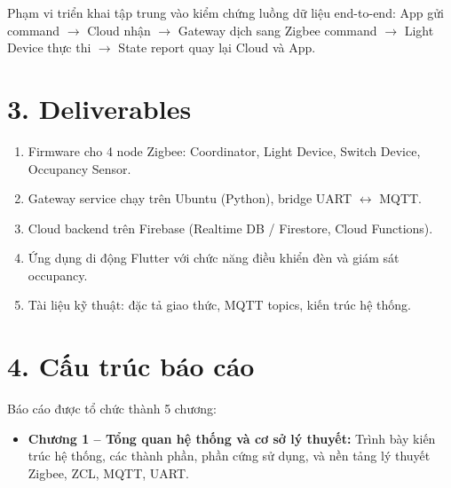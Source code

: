 Phạm vi triển khai tập trung vào kiểm chứng luồng dữ liệu end-to-end: App gửi command $\rightarrow$ Cloud nhận $\rightarrow$ Gateway dịch sang Zigbee command $\rightarrow$ Light Device thực thi $\rightarrow$ State report quay lại Cloud và App.

\section*{3. Deliverables}
\label{sec:modau-deliverables}

\begin{enumerate}
    \item Firmware cho 4 node Zigbee: Coordinator, Light Device, Switch Device, Occupancy Sensor.
    \item Gateway service chạy trên Ubuntu (Python), bridge UART $\leftrightarrow$ MQTT.
    \item Cloud backend trên Firebase (Realtime DB / Firestore, Cloud Functions).
    \item Ứng dụng di động Flutter với chức năng điều khiển đèn và giám sát occupancy.
    \item Tài liệu kỹ thuật: đặc tả giao thức, MQTT topics, kiến trúc hệ thống.
\end{enumerate}

\section*{4. Cấu trúc báo cáo}
\label{sec:modau-cautruc}

Báo cáo được tổ chức thành 5 chương:

\begin{itemize}
    \item \textbf{Chương 1 -- Tổng quan hệ thống và cơ sở lý thuyết:} Trình bày kiến trúc hệ thống, các thành phần, phần cứng sử dụng, và nền tảng lý thuyết Zigbee, ZCL, MQTT, UART.
   
\end{itemize}

\newpage
